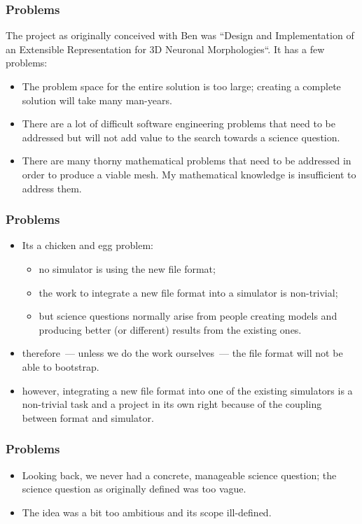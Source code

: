 \documentclass{beamer}
\begin{document}
\begin{frame}
\frametitle{Problems}

The project as originally conceived with Ben was ``Design and
Implementation of an Extensible Representation for 3D Neuronal
Morphologies``. It has a few problems:

\begin{itemize}
\item The problem space for the entire solution is too large; creating
  a complete solution will take many man-years.
  \pause
\item There are a lot of difficult software engineering problems that
  need to be addressed but will not add value to the search towards a
  science question.
\pause
\item There are many thorny mathematical problems that need to be
  addressed in order to produce a viable mesh. My mathematical
  knowledge is insufficient to address them.
\end{itemize}

\end{frame}

\begin{frame}
\frametitle{Problems}

\begin{itemize}
\item Its a chicken and egg problem:
  \begin{itemize}
  \item no simulator is using the new file format;
    \pause
  \item the work to integrate a new file format into a
    simulator is non-trivial;
    \pause
  \item but science questions normally arise from people creating
    models and producing better (or different) results from the
    existing ones.
    \pause
  \end{itemize}
\item therefore~--- unless we do the work ourselves~--- the file
  format will not be able to bootstrap.
\pause
\item however, integrating a new file format into one of the existing
  simulators is a non-trivial task and a project in its own right
  because of the coupling between format and simulator.
\end{itemize}

\end{frame}

\begin{frame}
\frametitle{Problems}

\begin{itemize}
\item Looking back, we never had a concrete, manageable science
  question; the science question as originally defined was too vague.
  \pause
\item The idea was a bit too ambitious and its scope ill-defined.
\end{itemize}

\end{frame}
\end{document}
